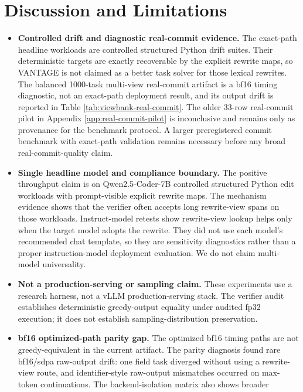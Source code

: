 \documentclass[11pt,a4paper]{article}
\begin{document}
\section{Discussion and Limitations}
\label{sec:limitations}

\begin{itemize}
\item \textbf{Controlled drift and diagnostic real-commit evidence.} The
  exact-path headline workloads are controlled structured Python drift suites.
  Their deterministic targets are exactly recoverable by the explicit rewrite
  maps, so VANTAGE is not claimed as a better task solver for those lexical
  rewrites.
  The balanced 1000-task multi-view real-commit artifact is a bf16 timing
  diagnostic, not an exact-path deployment result, and its output drift is
  reported in Table \ref{tab:viewbank-real-commit}. The older 33-row
  real-commit pilot in Appendix \ref{app:real-commit-pilot} is inconclusive
  and remains only as provenance for the benchmark protocol. A larger
  preregistered commit benchmark with exact-path validation remains necessary
  before any broad real-commit-quality claim.
\item \textbf{Single headline model and compliance boundary.} The
  positive throughput claim is on Qwen2.5-Coder-7B controlled
  structured Python edit workloads with prompt-visible explicit rewrite
  maps. The mechanism evidence shows that the verifier often accepts long
  rewrite-view spans on those workloads. Instruct-model retests show rewrite-view
  lookup helps only when the target model adopts the rewrite. They did not use
  each model's recommended chat template, so they are sensitivity diagnostics
  rather than a proper instruction-model deployment evaluation. We do not claim
  multi-model universality.
\item \textbf{Not a production-serving or sampling claim.} These
  experiments use a research harness, not a vLLM production-serving
  stack. The verifier audit establishes deterministic greedy-output
  equality under audited fp32 execution; it does not establish
  sampling-distribution preservation.
\item \textbf{bf16 optimized-path parity gap.} The optimized bf16 timing
  paths are not greedy-equivalent in the current artifact. The parity diagnosis
  found rare bf16/sdpa raw-output drift: one field task diverged without using
  a rewrite-view route, and identifier-style raw-output mismatches occurred on
  max-token continuations. The backend-isolation matrix also shows broader

\end{itemize}
\end{document}
